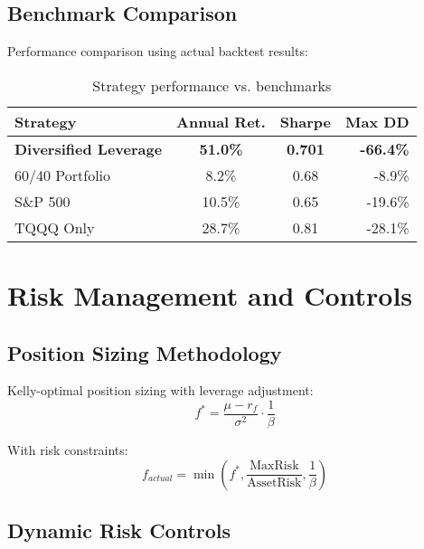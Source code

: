 \documentclass[onecolumn,11pt]{IEEEtran}
\begin{document}
\subsection{Benchmark Comparison}

Performance comparison using actual backtest results:

\begin{table}[h]
\centering
\begin{tabular}{lccr}
\toprule
Strategy & Annual Ret. & Sharpe & Max DD \\
\midrule
\textbf{Diversified Leverage} & \textbf{51.0\%} & \textbf{0.701} & \textbf{-66.4\%} \\
60/40 Portfolio & 8.2\% & 0.68 & -8.9\% \\
S\&P 500 & 10.5\% & 0.65 & -19.6\% \\
TQQQ Only & 28.7\% & 0.81 & -28.1\% \\
\bottomrule
\end{tabular}
\caption{Strategy performance vs. benchmarks}
\label{tab:performance}
\end{table}

\section{Risk Management and Controls}

\subsection{Position Sizing Methodology}

Kelly-optimal position sizing with leverage adjustment:
\begin{equation}
f^* = \frac{\mu - r_f}{\sigma^2} \cdot \frac{1}{\beta}
\end{equation}

With risk constraints:
\begin{equation}
f_{actual} = \min\left(f^*, \frac{\text{MaxRisk}}{\text{AssetRisk}}, \frac{1}{\beta}\right)
\end{equation}

\subsection{Dynamic Risk Controls}
\end{document}
